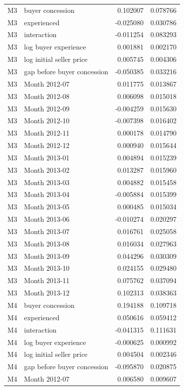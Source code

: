\documentclass[11pt,a4paper]{article}
\begin{document}
\begin{longtable}{lp{8.4cm}rr}
M3 & buyer concession & 0.102007 & 0.078766 \\
M3 & experienced & -0.025080 & 0.030786 \\
M3 & interaction & -0.011254 & 0.083293 \\
M3 & log buyer experience & 0.001881 & 0.002170 \\
M3 & log initial seller price & 0.005745 & 0.004306 \\
M3 & gap before buyer concession & -0.050385 & 0.033216 \\
M3 & Month 2012-07 & 0.011775 & 0.013867 \\
M3 & Month 2012-08 & 0.006098 & 0.015018 \\
M3 & Month 2012-09 & -0.004259 & 0.015630 \\
M3 & Month 2012-10 & -0.007398 & 0.016402 \\
M3 & Month 2012-11 & 0.000178 & 0.014790 \\
M3 & Month 2012-12 & 0.000940 & 0.015644 \\
M3 & Month 2013-01 & 0.004894 & 0.015239 \\
M3 & Month 2013-02 & 0.013287 & 0.015960 \\
M3 & Month 2013-03 & 0.004882 & 0.015458 \\
M3 & Month 2013-04 & -0.005884 & 0.015399 \\
M3 & Month 2013-05 & 0.000485 & 0.015034 \\
M3 & Month 2013-06 & -0.010274 & 0.020297 \\
M3 & Month 2013-07 & 0.016761 & 0.025058 \\
M3 & Month 2013-08 & 0.016034 & 0.027963 \\
M3 & Month 2013-09 & 0.044296 & 0.030309 \\
M3 & Month 2013-10 & 0.024155 & 0.029480 \\
M3 & Month 2013-11 & 0.075762 & 0.037094 \\
M3 & Month 2013-12 & 0.102313 & 0.038363 \\
M4 & buyer concession & 0.194188 & 0.109718 \\
M4 & experienced & 0.050616 & 0.059412 \\
M4 & interaction & -0.041315 & 0.111631 \\
M4 & log buyer experience & -0.000625 & 0.000992 \\
M4 & log initial seller price & 0.004504 & 0.002346 \\
M4 & gap before buyer concession & -0.095870 & 0.020875 \\
M4 & Month 2012-07 & 0.006580 & 0.009607 \\

\end{longtable}
\end{document}
